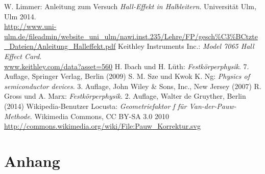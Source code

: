 \documentclass[a4paper, parskip=half, 12pt, bibliography=totocnumbered]{scrartcl}
\begin{document}





\begin{thebibliography}{10}
 W. Limmer: Anleitung zum Versuch \emph{Hall-Effekt in Halbleitern}. Universität Ulm, Ulm 2014.\\
\url{http://www.uni-ulm.de/fileadmin/website_uni_ulm/nawi.inst.235/Lehre/FP/gesch%C3%BCtzte_Dateien/Anleitung_Halleffekt.pdf}
 Keithley Instruments Inc.: \emph{Model 7065 Hall Effect Card}.\\
\url{www.keithley.com/data?asset=560}
 H. Ibach und H. Lüth: \emph{Festkörperphysik}. 7. Auflage, Springer Verlag, Berlin (2009)
 S. M. Sze und Kwok K. Ng: \emph{Physics of semiconductor devices}. 3. Auflage, John Wiley \& Sons, Inc., New Jersey (2007)
 R. Gross und A. Marx: \emph{Festkörperphysik}. 2. Auflage, Walter de Gruyther, Berlin (2014)
 Wikipedia-Benutzer Locusta: \emph{Geometriefaktor f für Van-der-Pauw-Methode}. Wikimedia Commons, CC BY-SA 3.0 2010\\ \url{http://commons.wikimedia.org/wiki/File:Pauw_Korrektur.svg}
\end{thebibliography}

\newpage
\section{Anhang}
\vspace{2em}
\begin{addmargin}[-3em]{3em}

\end{addmargin}
\end{document}
